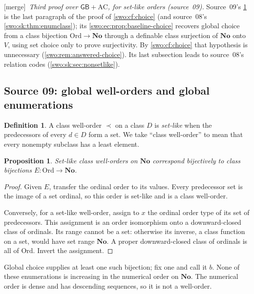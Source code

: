 \documentclass[11pt]{article}
\newtheorem{proposition}[proposition]{Proposition}
\theoremstyle{definition}
\newtheorem{definition}[definition]{Definition}
\theoremstyle{remark}
\newcommand{\No}{\mathbf{No}}
\newcommand{\Ord}{\mathrm{Ord}}
\newcommand{\GB}{\mathsf{GB}}
\newcommand{\merge}{\textsf{[merge]}}
\begin{document}
\merge\ \emph{Third proof over $\GB+\mathrm{AC}$, for set-like orders
(source~09).} Source~09's \cref{swo:ec:prop:global-equivalence} is the last
paragraph of the proof of \cref{swo:cf:choice} (and source~08's
\cref{swo:sk:thm:enumclass}); its \cref{swo:ec:prop:baseline-choice} recovers
global choice from a class bijection $\Ord\to\No$ through a definable class
surjection of $\No$ onto $V$, using set choice only to prove surjectivity. By
\cref{swo:cf:choice} that hypothesis is unnecessary
(\cref{swo:rem:answered-choice}). Its last subsection leads to source~08's
relation codes (\cref{swo:sk:sec:nonsetlike}).

\subsection{Source 09: global well-orders and global enumerations}
\label{swo:ec:sec:global}
\begin{definition}\label{swo:ec:n7.1}
A class well-order $\prec$ on a class $D$ is \emph{set-like} when the
predecessors of every $d\in D$ form a set. We take ``class well-order''
to mean that every nonempty subclass has a least element.
\end{definition}

\begin{proposition}\label{swo:ec:prop:global-equivalence}
Set-like class well-orders on $\No$ correspond bijectively to class
bijections $E:\Ord\to\No$.
\end{proposition}
\begin{proof}
Given $E$, transfer the ordinal order to its values. Every predecessor
set is the image of a set ordinal, so this order is set-like and is a
class well-order.

Conversely, for a set-like well-order, assign to $x$ the ordinal order
type of its set of predecessors. This assignment is an order isomorphism
onto a downward-closed class of ordinals. Its range cannot be a set:
otherwise its inverse, a class function on a set, would have set range
$\No$. A proper downward-closed class of ordinals is all of $\Ord$.
Invert the assignment.
\end{proof}

Global choice supplies at least one such bijection; fix one and call it
$b$. None of these enumerations is increasing in the numerical order on
$\No$. The numerical order is dense and has descending sequences, so
it is not a well-order.
\end{document}
